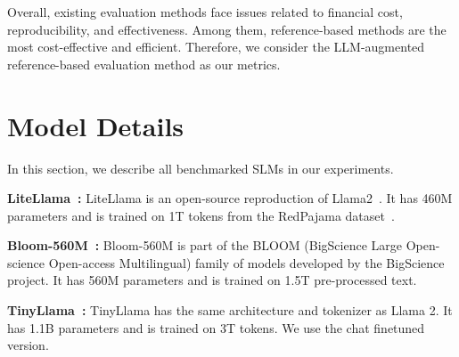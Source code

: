 Overall, existing evaluation methods face issues related to financial cost, reproducibility, and effectiveness. Among them, reference-based methods are the most cost-effective and efficient. Therefore, we consider the LLM-augmented reference-based evaluation method as our metrics.






\section{Model Details}
In this section, we describe all benchmarked SLMs in our experiments.

\textbf{LiteLlama~\cite{huggingface2024litelama}:} LiteLlama is an open-source reproduction of Llama2~\cite{touvron2023llama2openfoundation}. It has 460M parameters and is trained on 1T tokens from the RedPajama dataset~\cite{together2023redpajama}.

\textbf{Bloom-560M~\cite{bloom}:} Bloom-560M is part of the BLOOM (BigScience Large Open-science Open-access Multilingual) family of models developed by the BigScience project. It has 560M parameters and is trained on 1.5T pre-processed text.

\textbf{TinyLlama~\cite{zhang2024tinyllama}:} TinyLlama has the same architecture and tokenizer as Llama 2. It has 1.1B parameters and is trained on 3T tokens. We use the chat finetuned version.

